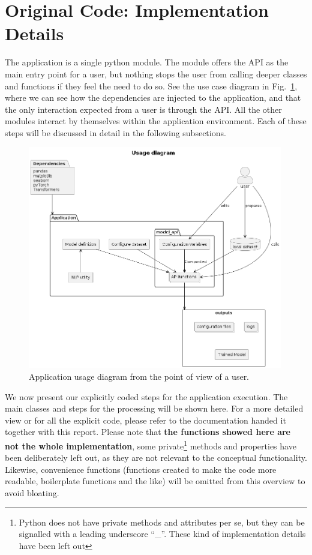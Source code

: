 \documentclass[a4paper, 11pt]{report}
\begin{document}
    \section{Original Code: Implementation Details}
    The application is a single python module. The module offers the API as the main entry point for a user, but nothing stops the user from calling deeper classes and functions if they feel the need to do so. See the use case diagram in Fig.~\ref{fig:usage}, where we can see how the dependencies are injected to the application, and that the only interaction expected from a user is through the API. All the other modules interact by themselves within the application environment. Each of these steps will be discussed in detail in the following subsections.
    \begin{figure}[ht!]
        \centering
        \includegraphics[width=0.99\textwidth]{usage.png}
        \caption{Application usage diagram from the point of view of a user.}
        \label{fig:usage}
    \end{figure}

   We now present our explicitly coded steps for the application execution. The main classes and steps for the processing will be shown here.  For a more detailed view or for all the explicit code, please refer to the documentation handed it together with this report. Please note that \textbf{the functions showed here are not the whole implementation}, some private\footnote{Python does not have private methods and attributes per se, but they can be signalled with a leading underscore ``\_''. These kind of implementation details have been left out} methods and properties have been deliberately left out, as they are not relevant to the conceptual functionality. Likewise, convenience functions (functions created to make the code more readable, boilerplate functions and the like) will be omitted from this overview to avoid bloating.
\end{document}
